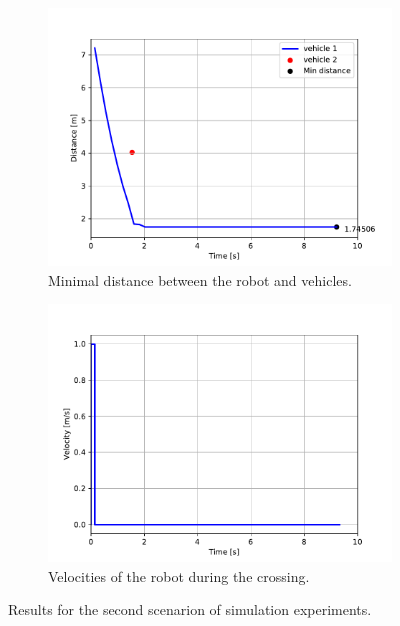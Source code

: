             \begin{figure}[ht]
                \centering
                \begin{subfigure}{0.49\linewidth}
                    \centering
                    \includegraphics[trim={24 8 35 41}, clip, width=\linewidth]{images/simulations/scene2_1_dist.pdf}
                    \caption{Minimal distance between the robot and vehicles.}
                \end{subfigure}
                \begin{subfigure}{0.49\linewidth}
                    \centering
                    \includegraphics[trim={21 8 40 41}, clip, width=\linewidth]{images/simulations/scene2_1_vel.pdf}
                    \caption{Velocities of the robot during the crossing.}
                \end{subfigure}
                \caption{Results for the second scenarion of simulation experiments.}
                \label{fig:scene2_1_graphs}
            \end{figure}
